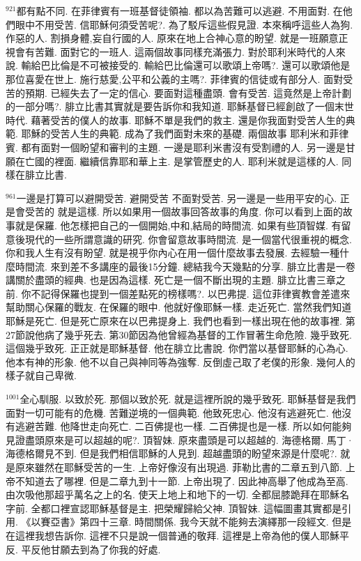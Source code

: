 \documentclass{book}
\begin{document}
$^{921}$都有點不同.
在菲律賓有一班基督徒領袖.
都以為苦難可以逃避.
不用面對.
在他們眼中不用受苦.
信耶穌何須受苦呢?.
為了駁斥這些假見證.
本來稱呼這些人為狗.
作惡的人.
割損身體,妄自行國的人.
原來在地上合神心意的盼望.
就是一班願意正視會有苦難.
面對它的一班人.
這兩個故事同樣充滿張力.
對於耶利米時代的人來說.
輸給巴比倫是不可被接受的.
輸給巴比倫還可以歌頌上帝嗎?.
還可以歌頌他是那位喜愛在世上.
施行慈愛,公平和公義的主嗎?.
菲律賓的信徒或有部分人.
面對受苦的預期.
已經失去了一定的信心.
要面對這種盡頭.
會有受苦.
這竟然是上帝計劃的一部分嗎?.
腓立比書其實就是要告訴你和我知道.
耶穌基督已經創啟了一個末世時代.
藉著受苦的僕人的故事.
耶穌不單是我們的救主.
還是你我面對受苦人生的典範.
耶穌的受苦人生的典範.
成為了我們面對未來的基礎.
兩個故事 耶利米和菲律賓.
都有面對一個盼望和審判的主題.
一邊是耶利米書沒有受割禮的人.
另一邊是甘願在亡國的裡面.
繼續信靠耶和華上主.
是掌管歷史的人.
耶利米就是這樣的人.
同樣在腓立比書.

$^{961}$一邊是打算可以避開受苦.
避開受苦 不面對受苦.
另一邊是一些用平安的心.
正是會受苦的 就是這樣.
所以如果用一個故事回答故事的角度.
你可以看到上面的故事就是保羅.
他怎樣把自己的一個開始,中和,結局的時間流.
如果有些頂智媒.
有留意後現代的一些所謂意識的研究.
你會留意故事時間流.
是一個當代很重視的概念.
你和我人生有沒有盼望.
就是視乎你內心在用一個什麼故事去發展.
去經驗一種什麼時間流.
來到差不多講座的最後15分鐘.
總結我今天幾點的分享.
腓立比書是一卷講關於盡頭的經典.
也是因為這樣.
死亡是一個不斷出現的主題.
腓立比書三章之前.
你不記得保羅也提到一個差點死的榜樣嗎?.
以巴弗提.
這位菲律賓教會差遣來幫助關心保羅的戰友.
在保羅的眼中.
他就好像耶穌一樣.
走近死亡.
當然我們知道耶穌是死亡.
但是死亡原來在以巴弗提身上.
我們也看到一樣出現在他的故事裡.
第27節說他病了幾乎死去.
第30節因為他曾經為基督的工作冒著生命危險.
幾乎致死.
這個幾乎致死.
正正就是耶穌基督.
他在腓立比書說.
你們當以基督耶穌的心為心.
他本有神的形象.
他不以自己與神同等為強奪.
反倒虛己取了老僕的形象.
幾何人的樣子就自己卑微.

$^{1001}$全心馴服.
以致於死.
那個以致於死.
就是這裡所說的幾乎致死.
耶穌基督是我們面對一切可能有的危機.
苦難逆境的一個典範.
他致死忠心.
他沒有逃避死亡.
他沒有逃避苦難.
他降世走向死亡.
二百佛提也一樣.
二百佛提也是一樣.
所以如何能夠見證盡頭原來是可以超越的呢?.
頂智妹.
原來盡頭是可以超越的.
海德格爾.
馬丁·海德格爾見不到.
但是我們相信耶穌的人見到.
超越盡頭的盼望來源是什麼呢?.
就是原來雖然在耶穌受苦的一生.
上帝好像沒有出現過.
菲勒比書的二章五到八節.
上帝不知道去了哪裡.
但是二章九到十一節.
上帝出現了.
因此神高舉了他成為至高.
由次吸他那超乎萬名之上的名.
使天上地上和地下的一切.
全都屈膝跪拜在耶穌名字前.
全都口裡宣認耶穌基督是主.
把榮耀歸給父神.
頂智妹.
這幅圖畫其實都是引用.
《以賽亞書》第四十三章.
時間關係.
我今天就不能夠去演繹那一段經文.
但是在這裡我想告訴你.
這裡不只是說一個普通的敬拜.
這裡是上帝為他的僕人耶穌平反.
平反他甘願去到為了你我的好處.
\end{document}
